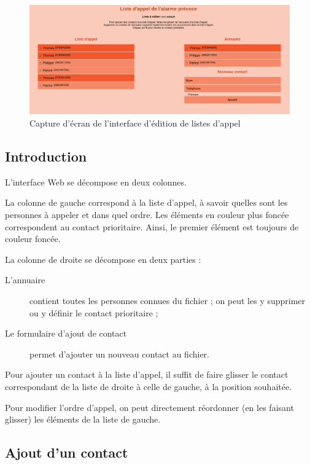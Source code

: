 \documentclass{article}
\begin{document}
\begin{center}
    \begin{figure}[h!]
      \includegraphics[width=\linewidth]{Illustrations/Interface_Appels.png}
      \caption{Capture d'écran de l'interface d'édition de listes d'appel}
      \label{fig:interface_web}
    \end{figure}
\end{center}

\subsection{Introduction}

L'interface Web se décompose en deux colonnes. 

La colonne de gauche correspond à la liste d'appel, à savoir quelles sont les personnes à appeler et dans quel ordre. Les éléments en couleur plus foncée correspondent au contact prioritaire. Ainsi, le premier élément est toujours de couleur foncée.

La colonne de droite se décompose en deux parties :

\begin{description}
    \item[L'annuaire] contient toutes les personnes connues du fichier ; on peut les y supprimer ou y définir le contact prioritaire ;
    \item[Le formulaire d'ajout de contact] permet d'ajouter un nouveau contact au fichier.
\end{description}

Pour ajouter un contact à la liste d'appel, il suffit de faire glisser le contact correspondant de la liste de droite à celle de gauche, à la position souhaitée.

Pour modifier l'ordre d'appel, on peut directement réordonner (en les faisant glisser) les éléments de la liste de gauche.

\subsection{Ajout d'un contact}
\end{document}
